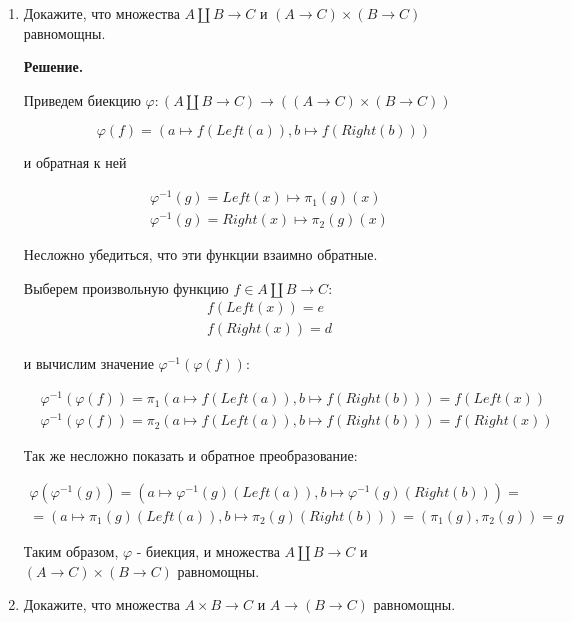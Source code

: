 \begin{enumerate}
\item Докажите, что множества $A \amalg B \to C$ и $(A \to C) \times (B \to C)$ равномощны.

\textbf{Решение.} 

Приведем биекцию $\varphi : (A \amalg B \to C) \rightarrow ((A \to C) \times (B \to C))$

\begin{equation*}
	\varphi(f) = (a \mapsto f(Left(a)), b \mapsto f(Right(b)))
\end{equation*}

и обратная к ней

\begin{align*}
	& \varphi^{-1}(g) = Left(x) \mapsto \pi_1(g)(x) \\
	& \varphi^{-1}(g) = Right(x) \mapsto \pi_2(g)(x)
\end{align*}

Несложно убедиться, что эти функции взаимно обратные.

Выберем произвольную функцию $f\in A \amalg B \to C$:
\begin{align*}
	& f(Left(x)) = e \\
	& f(Right(x)) = d
\end{align*}

и вычислим значение $\varphi^{-1}(\varphi(f))$:

\begin{align*}
	& \varphi^{-1}(\varphi(f)) = \pi_1(a \mapsto f(Left(a)), b \mapsto 	f(Right(b))) = f(Left(x)) \\
	& \varphi^{-1}(\varphi(f)) = \pi_2(a \mapsto f(Left(a)), b \mapsto 	f(Right(b))) = f(Right(x))
\end{align*}

Так же несложно показать и обратное преобразование:

\begin{equation*}
\begin{array} {lcl}
	\varphi(\varphi^{-1}(g)) = (a \mapsto \varphi^{-1}(g)(Left(a)), b 	\mapsto \varphi^{-1}(g)(Right(b))) = 
	\\
	= (a \mapsto \pi_1(g)(Left(a)), b \mapsto \pi_2(g)(Right(b))) = (\pi_1(g), \pi_2(g)) = g
\end{array}
\end{equation*}

Таким образом, $\varphi$ - биекция, и множества $A \amalg B \to C$ и $(A \to C) \times (B \to C)$ равномощны.

\item Докажите, что множества $A \times B \to C$ и $A \to (B \to C)$ равномощны.


\end{enumerate}
